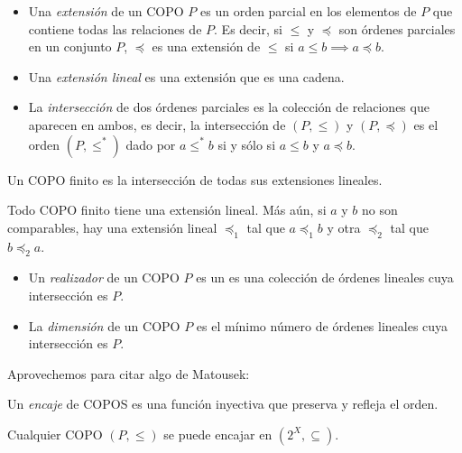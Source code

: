 \begin{definition}[Extensiones]
\label{definition-combi-017}\leavevmode
\begin{itemize}
\item Una \emph{extensión} de un COPO $P$ es
un orden parcial en los elementos de $P$ que
contiene todas las relaciones de $P$. Es
decir, si $\leq$ y $\preccurlyeq$ son órdenes
parciales en un conjunto $P$, $\preccurlyeq$
es una extensión de $\leq$ si $a\leq
b\implies a\preccurlyeq b$.

\item Una \emph{extensión lineal} es una
extensión que es una cadena.

\item La \emph{intersección} de dos órdenes
parciales es la colección de relaciones que
aparecen en ambos, es decir, la intersección
de $(P,\leq)$ y $(P,\preccurlyeq)$ es el
orden $(P,\leq^*)$ dado por $a\leq^*b$ si y
sólo si $a\leq b$ y $a\preccurlyeq b$.
\end{itemize}
\end{definition}

\begin{theorem}
\label{theorem-combi-012}
Un COPO finito es la intersección de todas
sus extensiones lineales.
\end{theorem}

\begin{theorem}
\label{theorem-combi-013}
Todo COPO finito tiene una extensión lineal.
Más aún, si $a$ y $b$ no son comparables, hay
una extensión lineal $\preccurlyeq_1$ tal que
$a\preccurlyeq_1 b$ y otra $\preccurlyeq_2$
tal que $b\preccurlyeq_2 a$.
\end{theorem}

\begin{definition}
\label{definition-combi-018}\leavevmode
\begin{itemize}
\item Un \emph{realizador} de un COPO $P$ es
un es una colección de órdenes lineales cuya
intersección es $P$.
\item La \emph{dimensión} de un COPO $P$ es
el mínimo número de órdenes lineales cuya
intersección es $P$.
\end{itemize}
\end{definition}
Aprovechemos para citar algo de Matousek:
\begin{definition}
\label{definition-combi-019}
Un \emph{encaje} de COPOS es una función
inyectiva que preserva y refleja el orden.
\end{definition}
\begin{theorem}
\label{theorem-combi-014}
Cualquier COPO $(P,\leq)$ se puede encajar en
$(2^X,\subseteq)$.
\end{theorem}


